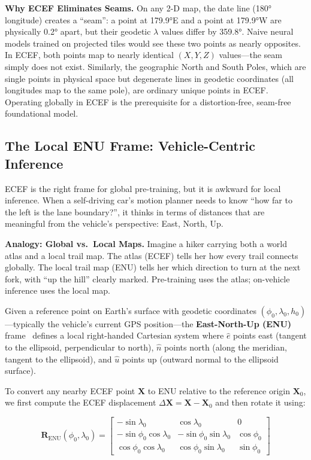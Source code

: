 \documentclass{book}
\begin{document}
 
\textbf{Why ECEF Eliminates Seams.}
On any 2-D map, the date line (180° longitude) creates a
``seam'': a point at 179.9°E and a point at 179.9°W are
physically 0.2° apart, but their geodetic $\lambda$ values differ
by 359.8°.  Naive neural models trained on projected tiles would see
these two points as nearly opposites.  In ECEF, both points map to
nearly identical $(X, Y, Z)$ values---the seam simply does not exist.
Similarly, the geographic North and South Poles, which are single
points in physical space but degenerate lines in geodetic coordinates
(all longitudes map to the same pole), are ordinary unique points in
ECEF.  Operating globally in ECEF is the prerequisite for a
distortion-free, seam-free foundational model.
 
\subsection{The Local ENU Frame: Vehicle-Centric Inference}
\label{sec:enu}
 
ECEF is the right frame for global pre-training, but it is awkward
for local inference.  When a self-driving car's motion planner needs
to know ``how far to the left is the lane boundary?'', it thinks
in terms of distances that are meaningful from the vehicle's
perspective: East, North, Up.
 
\textbf{Analogy: Global vs.\ Local Maps.}
Imagine a hiker carrying both a world atlas and a local trail map.
The atlas (ECEF) tells her how every trail connects globally.
The local trail map (ENU) tells her which direction to turn at the
next fork, with ``up the hill'' clearly marked.  Pre-training uses
the atlas; on-vehicle inference uses the local map.
 
Given a reference point on Earth's surface with geodetic coordinates
$(\phi_0, \lambda_0, h_0)$---typically the vehicle's current
GPS position---the \textbf{East-North-Up (ENU)} frame~\cite{nima2000wgs84}
defines a local right-handed Cartesian system where $\hat{e}$ points
east (tangent to the ellipsoid, perpendicular to north), $\hat{n}$
points north (along the meridian, tangent to the ellipsoid), and
$\hat{u}$ points up (outward normal to the ellipsoid surface).
 
To convert any nearby ECEF point $\mathbf{X}$ to ENU relative to the
reference origin $\mathbf{X}_0$, we first compute the ECEF displacement
$\Delta\mathbf{X} = \mathbf{X} - \mathbf{X}_0$ and then rotate it
using:

\begin{equation}
  \mathbf{R}_{\text{ENU}}(\phi_0, \lambda_0) =
  \begin{bmatrix}
    -\sin\lambda_0            &  \cos\lambda_0            &  0          \\
    -\sin\phi_0\cos\lambda_0  & -\sin\phi_0\sin\lambda_0  &  \cos\phi_0 \\
     \cos\phi_0\cos\lambda_0  &  \cos\phi_0\sin\lambda_0  &  \sin\phi_0
  \end{bmatrix}
  \label{eq:enu_rotation}
\end{equation}
\end{document}

